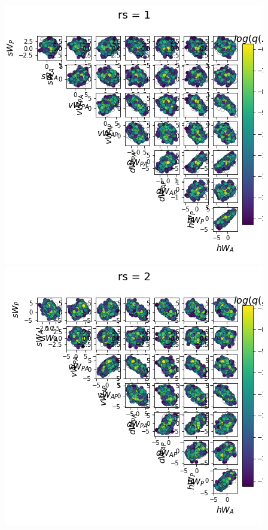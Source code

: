 \documentclass[11pt]{article}
\begin{document}
\begin{center}
\includegraphics[scale=0.33]{figs/Z_SC_pvar_full_c=0_p=80_rs=1.png}
\includegraphics[scale=0.33]{figs/Z_SC_pvar_full_c=0_p=80_rs=2.png}

\end{center}
\end{document}
